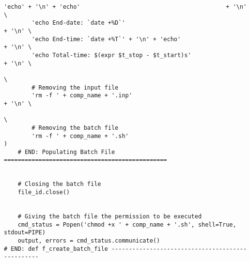 \documentclass[11pt]{article}
\begin{document}
\begin{lstlisting}[style=BashInputStyle]
        'echo' + '\n' + 'echo'                                          + '\n' \
        'echo End-date: `date +%D`'                                     + '\n' \
        'echo End-time: `date +%T`' + '\n' + 'echo'                     + '\n' \
        'echo Total-time: $(expr $t_stop - $t_start)s'                  + '\n' \
                                                                               \
        # Removing the input file
        'rm -f ' + comp_name + '.inp'                                   + '\n' \
                                                                               \
        # Removing the batch file
        'rm -f ' + comp_name + '.sh'                                           )
    # END: Populating Batch File ===============================================
    
    
    # Closing the batch file
    file_id.close()
    
    
    # Giving the batch file the permission to be executed
    cmd_status = Popen('chmod +x ' + comp_name + '.sh', shell=True, stdout=PIPE)
    output, errors = cmd_status.communicate()
# END: def f_create_batch_file -------------------------------------------------
\end{lstlisting}
\end{document}
